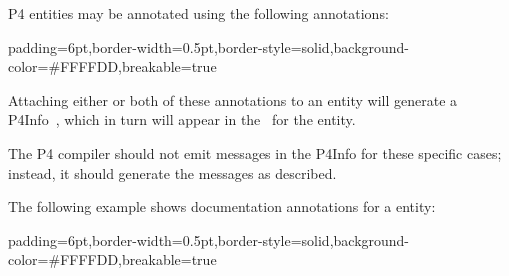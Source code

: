 \documentclass[11pt]{article}
\begin{document}
{%
\noindent{}P4 entities may be annotated using the following annotations:%

\begin{mdbmargintb}{6pt}{6pt}%
\begin{mdblock}{padding=6pt,border-width=0.5pt,border-style=solid,background-color=\#FFFFDD,breakable=true}%
\begin{mdpre}%
\end{mdpre}%
\end{mdblock}%
\end{mdbmargintb}%

\noindent{}Attaching either or both of these annotations to an entity will generate a
P4Info~, which in turn will
appear in the~ for the entity.%

The P4 compiler should not emit  messages in the P4Info for these
specific cases; instead, it should generate the  messages as
described.%

The following example shows documentation annotations for a  entity:%

\begin{mdbmargintb}{6pt}{6pt}%
\begin{mdblock}{padding=6pt,border-width=0.5pt,border-style=solid,background-color=\#FFFFDD,breakable=true}%
\begin{mdpre}%
\end{mdpre}%
\end{mdblock}%
\end{mdbmargintb}%

}
\end{document}
